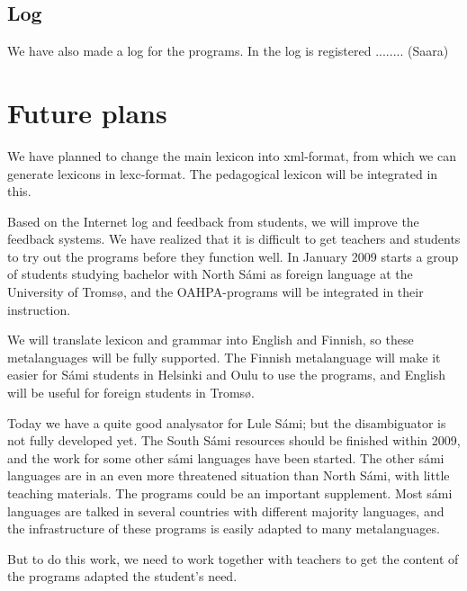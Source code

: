 \documentclass[a4paper,12pt]{article}
\begin{document}
\subsection{Log}
We have also made a log for the programs. In the log is registered ........ (Saara)

\section{Future plans}
We have planned to change the main lexicon into xml-format, from which we can generate lexicons in lexc-format. The pedagogical lexicon will be integrated in this.

Based on the Internet log and feedback from students, we will improve the feedback systems. We have realized that it is difficult to get teachers and students to try out the programs before they function well. In January 2009 starts a group of students studying bachelor with North Sámi as foreign language at the University of Tromsø, and the OAHPA-programs will be integrated in their instruction. 

We will translate lexicon and grammar into English and Finnish, so these metalanguages will be fully supported. The Finnish metalanguage will make it easier for Sámi students in Helsinki and Oulu to use the programs, and English will be useful for foreign students in Tromsø.

Today we have a quite good analysator for Lule Sámi; but the disambiguator is not fully developed yet. The South Sámi resources should be finished within 2009, and the work for some other sámi languages have been started. The other sámi languages are in an even more threatened situation than North Sámi, with little teaching materials. The programs could be an important supplement. Most sámi languages are talked in several countries with different majority languages, and the infrastructure of these programs is easily adapted to many metalanguages.

But to do this work, we need to work together with teachers to get the content of the programs adapted the student's need.


\newpage

\par



	
\end{document}
